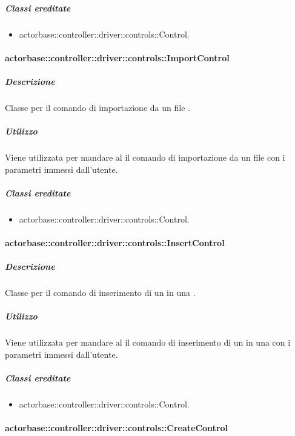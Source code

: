 \documentclass{scalatekids-article}
\begin{document}
\subparagraph{Classi ereditate}

\begin{itemize}
\item actorbase::controller::driver::controls::Control.
\end{itemize}

\paragraph{actorbase::controller::driver::controls::ImportControl}

\subparagraph{Descrizione}

Classe per il comando di importazione da un file .

\subparagraph{Utilizzo}

Viene utilizzata per mandare al  il comando di importazione da
un file  con i parametri immessi dall'utente.

\subparagraph{Classi ereditate}

\begin{itemize}
\item actorbase::controller::driver::controls::Control.
\end{itemize}

\paragraph{actorbase::controller::driver::controls::InsertControl}

\subparagraph{Descrizione}

Classe per il comando di inserimento di un  in una .

\subparagraph{Utilizzo}

Viene utilizzata per mandare al  il comando di inserimento di un
 in una  con i parametri immessi dall'utente.

\subparagraph{Classi ereditate}

\begin{itemize}
\item actorbase::controller::driver::controls::Control.
\end{itemize}

\paragraph{actorbase::controller::driver::controls::CreateControl}
\end{document}
